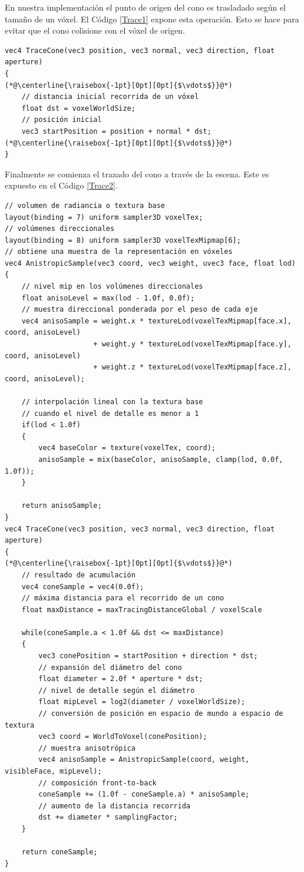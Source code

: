 En nuestra implementación el punto de origen del cono es trasladado según el tamaño de un vóxel. El Código \ref{Trace1} expone esta operación. Esto se hace para evitar que el cono colisione con el vóxel de origen.
\\
\begin{lstlisting}[caption={Traslado de origen del cono.}, label=Trace1]
vec4 TraceCone(vec3 position, vec3 normal, vec3 direction, float aperture)
{
(*@\centerline{\raisebox{-1pt}[0pt][0pt]{$\vdots$}}@*)
    // distancia inicial recorrida de un vóxel 
    float dst = voxelWorldSize;
    // posición inicial
    vec3 startPosition = position + normal * dst;
(*@\centerline{\raisebox{-1pt}[0pt][0pt]{$\vdots$}}@*)
}
\end{lstlisting}
Finalmente se comienza el trazado del cono a través de la escena. Este es expuesto en el Código \ref{Trace2}.
\\
\begin{lstlisting}[caption={Trazado de cono con vóxeles.}, label=Trace2]
// volumen de radiancia o textura base
layout(binding = 7) uniform sampler3D voxelTex;
// volúmenes direccionales
layout(binding = 8) uniform sampler3D voxelTexMipmap[6];
// obtiene una muestra de la representación en vóxeles
vec4 AnistropicSample(vec3 coord, vec3 weight, uvec3 face, float lod)
{
    // nivel mip en los volúmenes direccionales
    float anisoLevel = max(lod - 1.0f, 0.0f);
    // muestra direccional ponderada por el peso de cada eje
    vec4 anisoSample = weight.x * textureLod(voxelTexMipmap[face.x], coord, anisoLevel)
                     + weight.y * textureLod(voxelTexMipmap[face.y], coord, anisoLevel)
                     + weight.z * textureLod(voxelTexMipmap[face.z], coord, anisoLevel);

    // interpolación lineal con la textura base 
    // cuando el nivel de detalle es menor a 1
    if(lod < 1.0f)
    {
        vec4 baseColor = texture(voxelTex, coord);
        anisoSample = mix(baseColor, anisoSample, clamp(lod, 0.0f, 1.0f));
    }

    return anisoSample;                    
}
vec4 TraceCone(vec3 position, vec3 normal, vec3 direction, float aperture)
{
(*@\centerline{\raisebox{-1pt}[0pt][0pt]{$\vdots$}}@*)
    // resultado de acumulación
    vec4 coneSample = vec4(0.0f);
    // máxima distancia para el recorrido de un cono
    float maxDistance = maxTracingDistanceGlobal / voxelScale

    while(coneSample.a < 1.0f && dst <= maxDistance)
    {
        vec3 conePosition = startPosition + direction * dst;
        // expansión del diámetro del cono
        float diameter = 2.0f * aperture * dst;
        // nivel de detalle según el diámetro
        float mipLevel = log2(diameter / voxelWorldSize);
        // conversión de posición en espacio de mundo a espacio de textura
        vec3 coord = WorldToVoxel(conePosition);
        // muestra anisotrópica
        vec4 anisoSample = AnistropicSample(coord, weight, visibleFace, mipLevel);
        // composición front-to-back
        coneSample += (1.0f - coneSample.a) * anisoSample;
        // aumento de la distancia recorrida
        dst += diameter * samplingFactor;
    }

    return coneSample;
}
\end{lstlisting}
